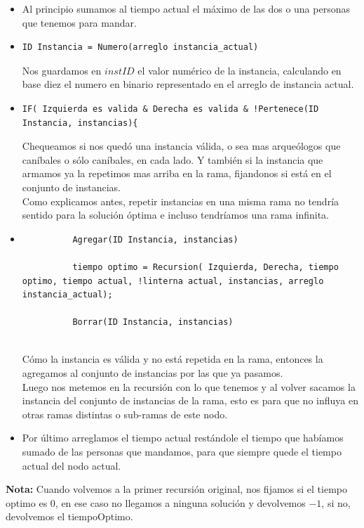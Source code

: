 \begin{itemize}
\item Al principio sumamos al tiempo actual el máximo de las dos o una personas que tenemos para mandar.
\item \begin{verbatim}
ID Instancia = Numero(arreglo instancia_actual) 				
\end{verbatim}
Nos guardamos en $instID$ el valor numérico de la instancia, calculando en base diez el numero en binario representado en el arreglo de instancia actual.
\item \begin{verbatim}
IF( Izquierda es valida & Derecha es valida & !Pertenece(ID Instancia, instancias){	
\end{verbatim}
Chequeamos si nos quedó una instancia válida, o sea mas arqueólogos que caníbales o sólo caníbales, en cada lado. Y también si la instancia que armamos ya la repetimos mas arriba en la rama, fijandonos si está en el conjunto de instancias. \\ Como explicamos antes, repetir instancias en una misma rama no tendría sentido para la solución óptima e incluso tendríamos una rama infinita. 
\item \begin{verbatim}
          Agregar(ID Instancia, instancias)
				
          tiempo optimo = Recursion( Izquierda, Derecha, tiempo optimo, tiempo actual, !linterna actual, instancias, arreglo instancia_actual);
				
          Borrar(ID Instancia, instancias)
				
\end{verbatim}
Cómo la instancia es válida y no está repetida en la rama, entonces la agregamos al conjunto de instancias por las que ya pasamos.\\
Luego nos metemos en la recursión con lo que tenemos y al volver sacamos la instancia del conjunto de instancias de la rama, esto es para que no influya en otras ramas distintas o sub-ramas de este nodo. 
\item Por último arreglamos el tiempo actual restándole el tiempo que habíamos sumado de las personas que mandamos, para que siempre quede el tiempo actual del nodo actual. 
\end{itemize}

\textbf{Nota:} Cuando volvemos a la primer recursión original, nos fijamos si el tiempo optimo es $0$, en ese caso no llegamos a ninguna solución y devolvemos $-1$, si no, devolvemos el tiempoOptimo.

